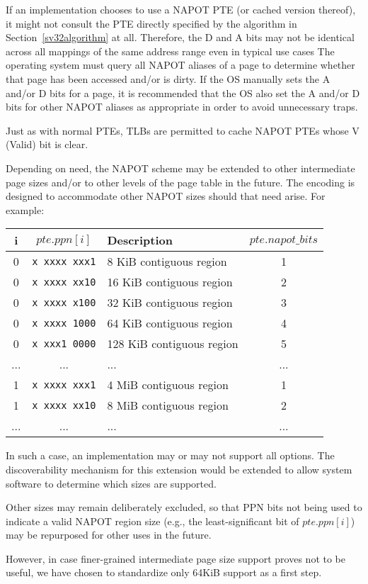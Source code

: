 \begin{commentary}
  If an implementation chooses to use a NAPOT PTE (or cached version thereof),
  it might not consult the PTE directly specified by the algorithm in
  Section~\ref{sv32algorithm} at all.  Therefore, the D and A bits may not be
  identical across all mappings of the same address range even in typical use
  cases  The operating system must query all NAPOT aliases of a page to
  determine whether that page has been accessed and/or is dirty.  If the OS
  manually sets the A and/or D bits for a page, it is recommended that the OS
  also set the A and/or D bits for other NAPOT aliases as appropriate in order
  to avoid unnecessary traps.

  Just as with normal PTEs, TLBs are permitted to cache NAPOT PTEs whose V
  (Valid) bit is clear.

  Depending on need, the NAPOT scheme may be extended to other intermediate
  page sizes and/or to other levels of the page table in the future.  The
  encoding is designed to accommodate other NAPOT sizes should that need
  arise.  For example:

  \begin{center}\em
  \begin{tabular}{|c|c||l|c|}
  \hline
  i        & $pte.ppn[i]$      & Description                & $pte.napot\_bits$ \\
  \hline
  0        & {\tt x~xxxx~xxx1} & 8 KiB contiguous region    & 1 \\
  0        & {\tt x~xxxx~xx10} & 16 KiB contiguous region   & 2 \\
  0        & {\tt x~xxxx~x100} & 32 KiB contiguous region   & 3 \\
  0        & {\tt x~xxxx~1000} & 64 KiB contiguous region   & 4 \\
  0        & {\tt x~xxx1~0000} & 128 KiB contiguous region  & 5 \\
  ...      & ...               & ...                        & ... \\
  1        & {\tt x~xxxx~xxx1} & 4 MiB contiguous region    & 1 \\
  1        & {\tt x~xxxx~xx10} & 8 MiB contiguous region    & 2 \\
  ...      & ...               & ...                        & ... \\
  \hline
  \end{tabular}
  \end{center}

  In such a case, an implementation may or may not support all options.  The
  discoverability mechanism for this extension would be extended to allow
  system software to determine which sizes are supported.

  Other sizes may remain deliberately excluded, so that PPN bits not being
  used to indicate a valid NAPOT region size (e.g., the least-significant bit
  of $pte.ppn[i]$) may be repurposed for other uses in the future.

  However, in case finer-grained intermediate page size support proves not to
  be useful, we have chosen to standardize only 64KiB support as a first step.
\end{commentary}

